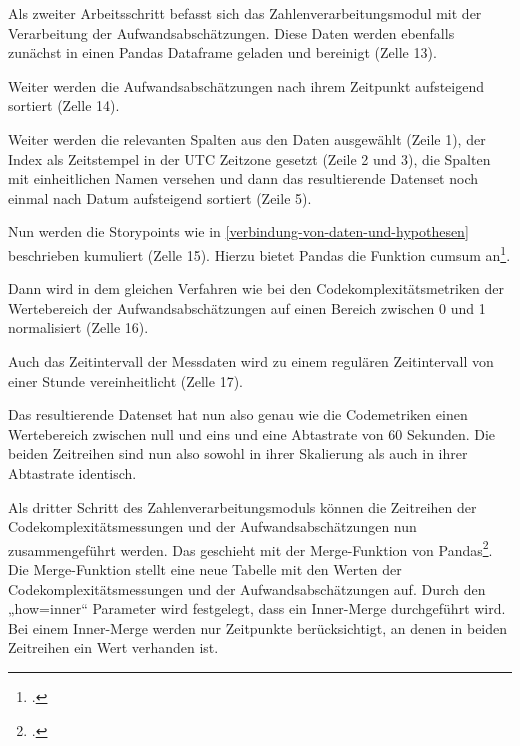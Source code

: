 Als zweiter Arbeitsschritt befasst sich das Zahlenverarbeitungsmodul mit
der Verarbeitung der Aufwandsabschätzungen. Diese Daten werden ebenfalls
zunächst in einen Pandas Dataframe geladen und bereinigt (Zelle 13).

\lstset{style=pythonStyle}


Weiter werden die Aufwandsabschätzungen nach ihrem Zeitpunkt aufsteigend
sortiert (Zelle 14).

\lstset{style=pythonStyle}


Weiter werden die relevanten Spalten aus den Daten ausgewählt (Zeile 1),
der Index als Zeitstempel in der \ac{UTC} Zeitzone gesetzt (Zeile 2 und 3),
die Spalten mit einheitlichen Namen versehen und dann das resultierende
Datenset noch einmal nach Datum aufsteigend sortiert (Zeile 5).

\lstset{style=pythonStyle}


Nun werden die Storypoints wie in \ref{verbindung-von-daten-und-hypothesen} beschrieben kumuliert (Zelle
15). Hierzu bietet Pandas die Funktion cumsum an\footcite[Vgl. ][]{PandasDataFrameCumsum}.

\lstset{style=pythonStyle}


Dann wird in dem gleichen Verfahren wie bei den Codekomplexitätsmetriken
der Wertebereich der Aufwandsabschätzungen auf einen Bereich zwischen 0
und 1 normalisiert (Zelle 16).

\lstset{style=pythonStyle}


Auch das Zeitintervall der Messdaten wird zu einem regulären
Zeitintervall von einer Stunde vereinheitlicht (Zelle 17).

\lstset{style=pythonStyle}


Das resultierende Datenset hat nun also genau wie die Codemetriken einen
Wertebereich zwischen null und eins und eine Abtastrate von 60 Sekunden.
Die beiden Zeitreihen sind nun also sowohl in ihrer Skalierung als auch
in ihrer Abtastrate identisch.

Als dritter Schritt des Zahlenverarbeitungsmoduls können die Zeitreihen
der Codekomplexitätsmessungen und der Aufwandsabschätzungen nun
zusammengeführt werden. Das geschieht mit der Merge-Funktion von
Pandas\footcite[Vgl. ][]{PandasDataFrameMergea}. Die Merge-Funktion stellt eine
neue Tabelle mit den Werten der Codekomplexitätsmessungen und der
Aufwandsabschätzungen auf. Durch den „how=inner`` Parameter wird
festgelegt, dass ein Inner-Merge durchgeführt wird. Bei einem
Inner-Merge werden nur Zeitpunkte berücksichtigt, an denen in beiden
Zeitreihen ein Wert verhanden ist.

